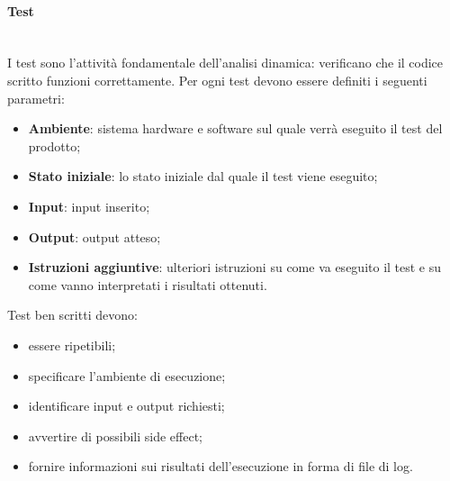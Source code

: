 		\paragraph{Test} \mbox{}\\	
		I test sono l'attività fondamentale dell'analisi dinamica: verificano che il codice scritto funzioni correttamente.
		Per ogni test devono  essere definiti i seguenti parametri:
		\begin{itemize}
			\item \textbf{Ambiente}: sistema hardware e software sul quale verrà eseguito il test del prodotto;
			\item \textbf{Stato iniziale}: lo stato iniziale dal quale il test viene eseguito;
			\item \textbf{Input}: input inserito;
			\item \textbf{Output}: output atteso;
			\item \textbf{Istruzioni aggiuntive}: ulteriori istruzioni su come va eseguito il test e su come vanno interpretati i risultati ottenuti.
		\end{itemize}
		Test ben scritti devono:
		\begin{itemize}
			\item essere ripetibili;
			\item specificare l'ambiente di esecuzione;
			\item identificare input e output richiesti;
			\item avvertire di possibili side effect;
			\item fornire informazioni sui risultati dell'esecuzione in forma di file di log.
		\end{itemize}	
			
